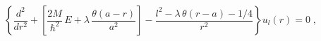 \begin{equation}
\left\{
 \frac{d^2}{dr^2}
+ 
\left[ 
\frac{2M}{\hbar^{2}} \,   E +
\lambda  
\,
\frac{  \theta (a-r) }{ a^{2} }
 \right]
-
\frac{l^{2} 
- \lambda \, \theta (r-a)
-1/4 
}{r^2}
\right\}
u_{l} (r)
=
0
\;  ,
\label{eq:radial_Schr_2D_ISP_circular_well_reg}
\end{equation}

